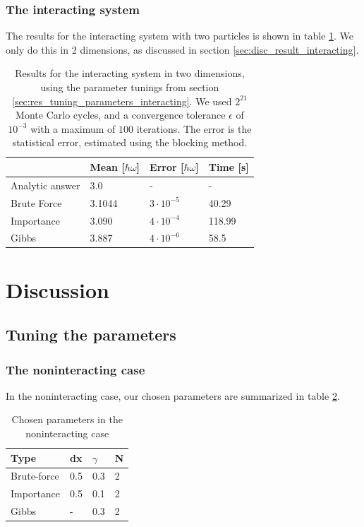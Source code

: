 \documentclass[a4paper, 10pt]{article}
\begin{document}
\subsubsection{The interacting system}
The results for the interacting system with two particles is shown in table \ref{tab:interacting_results}. We only do this in 2 dimensions, as discussed in section \ref{sec:disc_result_interacting}.
\begin{table}[ht!]
	\centering
	\caption{Results for the interacting system in two dimensions, using the parameter tunings from section \ref{sec:res_tuning_parameters_interacting}. We used $2^{21}$ Monte Carlo cycles, and a convergence tolerance $\epsilon$ of $10^{-3}$ with a maximum of $100$ iterations. The error is the statistical error, estimated using the blocking method.}
	\label{tab:interacting_results}
	\begin{tabular}{l|l|l|l|}
		& Mean [$\hbar \omega$] & Error [$\hbar \omega$]                         & Time [s] \\
		\hline
		Analytic answer & 3.0 &- &-\\
		Brute Force & 3.1044                    & $3\cdot 10^{-5}$                                   & 40.29        \\
		Importance  & 3.090                     & $4\cdot 10^{-4}$                                   & 118.99       \\
		Gibbs       & 3.887                     & $4\cdot 10^{-6}$				 & 58.5        
	\end{tabular}
\end{table}
\clearpage
\section{Discussion}
\subsection{Tuning the parameters}
\subsubsection{The noninteracting case}\label{sec:tuning_parameters_noninteracting}
In the noninteracting case, our chosen parameters are summarized in table \ref{tab:chosen_parameters_noninteracting}.
\begin{table}[ht!]
	\centering
	\caption{Chosen parameters in the noninteracting case}
	\label{tab:chosen_parameters_noninteracting}
	\begin{tabular}{llll}
		Type        & dx  & $\gamma$ & N \\
		\hline
		Brute-force & 0.5 & 0.3      & 2 \\
		Importance  & 0.5 & 0.1      & 2 \\
		Gibbs       & -   & 0.3      & 2
	\end{tabular}
\end{table}
\end{document}
